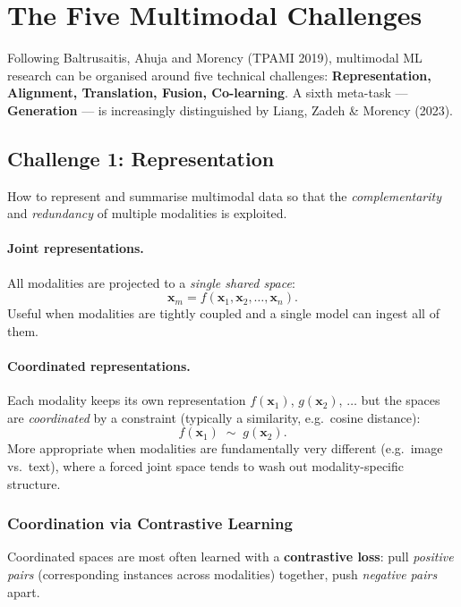 \documentclass[11pt,a4paper]{article}
\theoremstyle{definition}
\theoremstyle{plain}
\theoremstyle{remark}
\begin{document}
\section{The Five Multimodal Challenges}

Following Baltrusaitis, Ahuja and Morency (TPAMI 2019), multimodal ML research can be organised around five technical challenges: \textbf{Representation, Alignment, Translation, Fusion, Co-learning}. A sixth meta-task --- \textbf{Generation} --- is increasingly distinguished by Liang, Zadeh \& Morency (2023).

\subsection{Challenge 1: Representation}

How to represent and summarise multimodal data so that the \emph{complementarity} and \emph{redundancy} of multiple modalities is exploited.

\paragraph{Joint representations.} All modalities are projected to a \emph{single shared space}:
\[
    \mathbf{x}_m = f(\mathbf{x}_1, \mathbf{x}_2, \ldots, \mathbf{x}_n).
\]
Useful when modalities are tightly coupled and a single model can ingest all of them.

\paragraph{Coordinated representations.} Each modality keeps its own representation $f(\mathbf{x}_1)$, $g(\mathbf{x}_2)$, $\ldots$ but the spaces are \emph{coordinated} by a constraint (typically a similarity, e.g.\ cosine distance):
\[
    f(\mathbf{x}_1) \;\sim\; g(\mathbf{x}_2).
\]
More appropriate when modalities are fundamentally very different (e.g.\ image vs.\ text), where a forced joint space tends to wash out modality-specific structure.

\subsubsection{Coordination via Contrastive Learning}

Coordinated spaces are most often learned with a \textbf{contrastive loss}: pull \emph{positive pairs} (corresponding instances across modalities) together, push \emph{negative pairs} apart.
\end{document}
